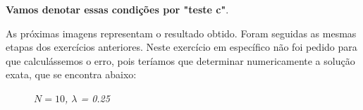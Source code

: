 \documentclass[a4paper, 12pt]{article}
\begin{document}
\textbf{Vamos denotar essas condições por "teste c"}.

As próximas imagens representam o resultado obtido. Foram seguidas as mesmas etapas dos exercícios anteriores. Neste exercício em específico não foi pedido para que calculássemos o erro, pois teríamos que determinar numericamente a solução exata, que se encontra abaixo:


\begin{figure}[H]
	\centering
	\caption{\textit{$N = 10$, $\lambda$ = 0.25}}
\end{figure}  
\end{document}
